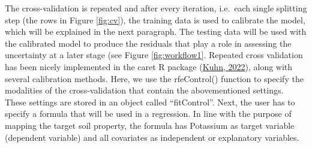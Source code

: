 \documentclass[
  10pt,
  b5paper,
  oneside]{book}
\begin{document}
The cross-validation is repeated and after every iteration, i.e.~each single splitting step (the rows in Figure \ref{fig:cv}), the training data is used to calibrate the model, which will be explained in the next paragraph. The testing data will be used with the calibrated model to produce the residuals that play a role in assessing the uncertainty at a later stage (see Figure \ref{fig:workflow1}.
Repeated cross validation has been nicely implemented in the caret R package (\protect\hyperlink{ref-Kuhn2022}{Kuhn, 2022}), along with several calibration methods. Here, we use the rfeControl() function to specify the modalities of the cross-validation that contain the abovementioned settings. These settings are stored in an object called ``fitControl''. Next, the user has to specify a formula that will be used in a regression. In line with the purpose of mapping the target soil property, the formula has Potassium as target variable (dependent variable) and all covariates as independent or explanatory variables.
\end{document}
